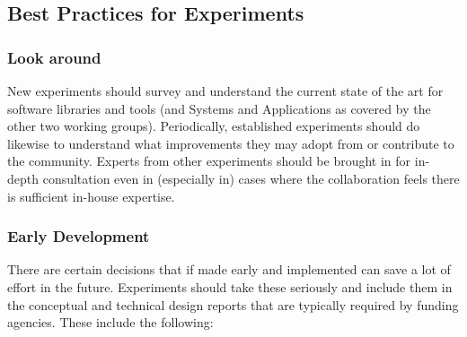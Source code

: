\subsection{Best Practices for Experiments}
\label{subsec:bestpractices}

\subsubsection{Look around}

New experiments should survey and understand the current state of the
art for software libraries and tools (and Systems and Applications as
covered by the other two working groups).  Periodically, established
experiments should do likewise to understand what improvements they
may adopt from or contribute to the community.  Experts from other
experiments should be brought in for in-depth consultation even in
(especially in) cases where the collaboration feels there is
sufficient in-house expertise.

\subsubsection{Early Development}

There are certain decisions that if made early and implemented can
save a lot of effort in the future.  Experiments should take these
seriously and include them in the conceptual and technical design
reports that are typically required by funding agencies.  These
include the following:

